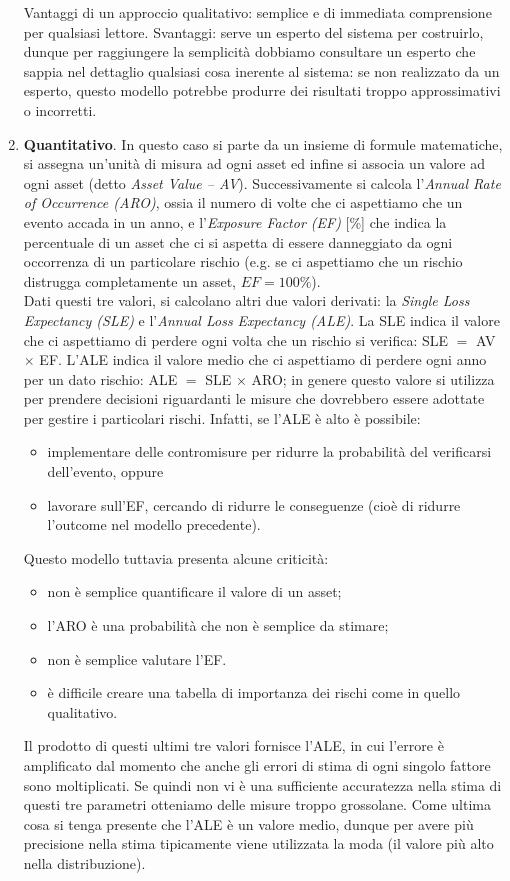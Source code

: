 \begin{enumerate}
\begin{enumerate}
	\end{enumerate}
	Vantaggi di un approccio qualitativo: semplice e di immediata comprensione per qualsiasi lettore. Svantaggi: serve un esperto del sistema per costruirlo, dunque per raggiungere la semplicità dobbiamo consultare un esperto che sappia nel dettaglio qualsiasi cosa inerente al sistema: se non realizzato da un esperto, questo modello potrebbe produrre dei risultati troppo approssimativi o incorretti.
	\item \textbf{Quantitativo}. In questo caso si parte da un insieme di formule matematiche, si assegna un'unità di misura ad ogni asset ed infine si associa un valore ad ogni asset (detto \textit{Asset Value -- AV}). Successivamente si calcola l'\textit{Annual Rate of Occurrence (ARO)}, ossia il numero di volte che ci aspettiamo che un evento accada in un anno, e l'\textit{Exposure Factor (EF)} [\%] che indica la percentuale di un asset che ci si aspetta di essere danneggiato da ogni occorrenza di un particolare rischio (e.g. se ci aspettiamo che un rischio distrugga completamente un asset, $EF=100\%$).\\
	Dati questi tre valori, si calcolano altri due valori derivati: la \textit{Single Loss Expectancy (SLE)} e l'\textit{Annual Loss Expectancy (ALE)}. La SLE indica il valore che ci aspettiamo di perdere ogni volta che un rischio si verifica: SLE $ = $ AV $\times$ EF. L'ALE indica il valore medio che ci aspettiamo di perdere ogni anno per un dato rischio: ALE $ = $ SLE $\times$ ARO; in genere questo valore si utilizza per prendere decisioni riguardanti le misure che dovrebbero essere adottate per gestire i particolari rischi. Infatti, se l'ALE è alto è possibile:
	\begin{itemize}
		\item implementare delle contromisure per ridurre la probabilità del verificarsi dell'evento, oppure
		\item lavorare sull'EF, cercando di ridurre le conseguenze (cioè di ridurre l'outcome nel modello precedente).
	\end{itemize}
	Questo modello tuttavia presenta alcune criticità:
	\begin{itemize}
		\item non è semplice quantificare il valore di un asset;
		\item l'ARO è una probabilità che non è semplice da stimare;
		\item non è semplice valutare l'EF.
		\item è difficile creare una tabella di importanza dei rischi come in quello qualitativo.
	\end{itemize}
	Il prodotto di questi ultimi tre valori fornisce l'ALE, in cui l'errore è amplificato dal momento che anche gli errori di stima di ogni singolo fattore sono moltiplicati. Se quindi non vi è una sufficiente accuratezza nella stima di questi tre parametri otteniamo delle misure troppo grossolane. Come ultima cosa si tenga presente che l'ALE è un valore medio, dunque per avere più precisione nella stima tipicamente viene utilizzata la moda (il valore più alto nella distribuzione). 
\end{enumerate}
